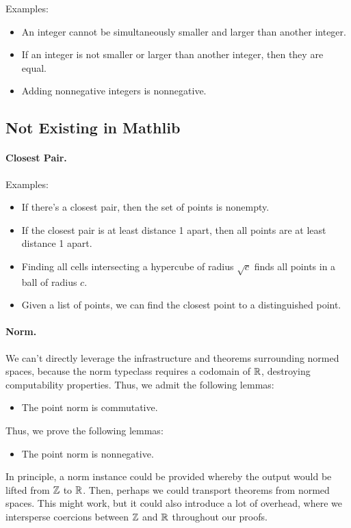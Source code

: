 \documentclass{article}
\begin{document}
Examples:
\begin{itemize}
  \item An integer cannot be simultaneously smaller and larger than another integer.
  \item If an integer is not smaller or larger than another integer, then they are equal.
  \item Adding nonnegative integers is nonnegative.
\end{itemize}

\subsection{Not Existing in Mathlib}
\paragraph{Closest Pair.}
Examples:
\begin{itemize}
  \item If there's a closest pair, then the set of points is nonempty.
  \item If the closest pair is at least distance 1 apart, then all points are at least distance 1 apart.
  \item Finding all cells intersecting a hypercube of radius $\sqrt{c}$ finds all points in a ball of radius $c$.
  \item Given a list of points, we can find the closest point to a distinguished point.
\end{itemize}

\paragraph{Norm.}
We can't directly leverage the infrastructure and theorems surrounding normed spaces, because the norm typeclass requires a codomain of $\mathbb{R}$, destroying computability properties.
Thus, we admit the following lemmas:
\begin{itemize}
  \item The point norm is commutative.
\end{itemize}
Thus, we prove the following lemmas:
\begin{itemize}
  \item The point norm is nonnegative.
\end{itemize}
In principle, a norm instance could be provided whereby the output would be lifted from $\mathbb{Z}$ to $\mathbb{R}$.
Then, perhaps we could transport theorems from normed spaces.
This might work, but it could also introduce a lot of overhead, where we intersperse coercions between $\mathbb{Z}$ and $\mathbb{R}$ throughout our proofs.




\end{document}
